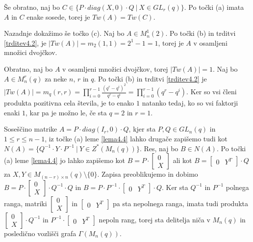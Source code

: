 \documentclass[mat1, tisk]{fmfdelo}
\begin{document}
\begin{dokaz}
  Še obratno, naj bo $C \in \{P \cdot diag(X,0) \cdot Q~|~ X \in GL_r(q)\}$. Po 
  točki (a) imata $A$ in $C$ enake sosede, torej je $Tw(A) = Tw(C)$.

  Nazadnje dokažimo še točko (c). Naj bo $A \in {M}_n^1(2)$. Po točki (b) in 
  trditvi \ref{trditev4.2}, je $|Tw(A)| = m_2(1,1) = 2^1 - 1 = 1$, torej je $A$ v 
  osamljeni množici dvojčkov.

  Obratno, naj bo $A$ v osamljeni množici dvojčkov, torej $|Tw(A)| = 1$. Naj bo 
  $A \in M_n^r(q)$ za neke $n$, $r$ in $q$. Po točki (b) in trditvi \ref{trditev4.2} je 
  $|Tw(A)| = m_q(r,r) = \prod\limits_{i=0}^{r-1} \frac{(q^r - q^i)^2}{q^r - q^i} = \prod\limits_{i=0}^{r-1}(q^r - q^i)$. 
  Ker so vsi členi produkta pozitivna cela števila, je to enako $1$ natanko tedaj, ko 
  so vsi faktorji enaki $1$, kar pa je možno le, če sta $q = 2$ in $r = 1$.
\end{dokaz}
%
\begin{opomba}\label{opomba4.5}
  Soseščino matrike $A = P \cdot diag(I_r, 0) \cdot Q$, 
  kjer sta $P, Q \in GL_n(q)$ in $1 \leq r \leq n-1$, iz točke (a) 
  leme \ref{lema4.4} lahko drugače zapišemo tudi kot 
  $N(A) = \{Q^{-1} \cdot Y \cdot P^{-1}~|~Y \in Z^*(M_n(q))\}$. Res, naj bo 
  $B \in N(A)$. Po točki (a) leme \ref{lema4.4} jo lahko zapišemo kot 
  $B = P \cdot 
  \begin{bmatrix}
    0 \\
    X
  \end{bmatrix}$ ali kot 
  $B = 
  \begin{bmatrix}
    0 & Y^T
  \end{bmatrix} \cdot Q$ za $X, Y \in M_{(n-r) \times n}(q)\setminus\{0\}$.
  Zapisa preoblikujemo in dobimo
  $B = P \cdot 
  \begin{bmatrix}
    0 \\
    X
  \end{bmatrix} \cdot Q^{-1} \cdot Q$ in
  $B = P \cdot P^{-1} \cdot
  \begin{bmatrix}
    0 & Y^T
  \end{bmatrix} \cdot Q$. Ker sta $Q^{-1}$ in $P^{-1}$ polnega ranga, matriki 
  $\begin{bmatrix}
    0 \\
    X
  \end{bmatrix}$ in 
  $\begin{bmatrix}
    0 & Y^T
  \end{bmatrix}$ pa sta nepolnega ranga, imata tudi produkta 
  $\begin{bmatrix}
    0 \\
    X
  \end{bmatrix} \cdot Q^{-1}$ in 
  $P^{-1} \cdot
  \begin{bmatrix}
    0 & Y^T
  \end{bmatrix}$ nepoln rang, torej sta delitelja niča v $M_n(q)$ 
  in posledično vozlišči grafa $\Gamma(M_n(q))$.
\end{opomba}
\end{document}

